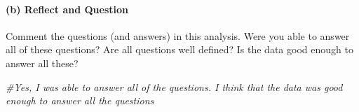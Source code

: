 \documentclass[
]{article}
\newenvironment{Shaded}{\begin{snugshade}}{\end{snugshade}}
\newcommand{\CommentTok}[1]{\textcolor[rgb]{0.56,0.35,0.01}{\textit{#1}}}
\begin{document}
\hypertarget{b-reflect-and-question-1}{%
\paragraph{(b) Reflect and Question}\label{b-reflect-and-question-1}}

Comment the questions (and answers) in this analysis. Were you able to
answer all of these questions? Are all questions well defined? Is the
data good enough to answer all these?

\begin{Shaded}
\begin{Highlighting}[]
\CommentTok{\#Yes, I was able to answer all of the questions. I think that the data was good enough to answer all the questions}
\end{Highlighting}
\end{Shaded}
\end{document}
